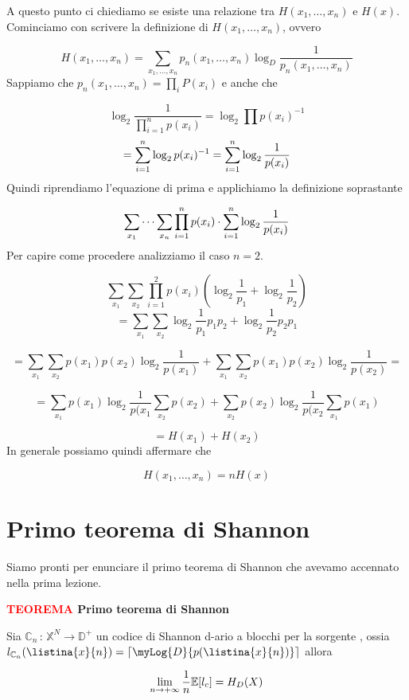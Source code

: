 \documentclass[12pt]{report}
\begin{document}
    \noindent
    A questo punto ci chiediamo se esiste una relazione tra $H(x_1,\dots,x_n)$ e $H(x)$.
    Cominciamo con scrivere la definizione di $H(x_1,\dots,x_n)$, ovvero

    $$H(x_1,\dots,x_n) = \sum_{x_1,\dots,x_n} p_n(x_1,\dots,x_n) \log_D{\frac{1}{p_n(x_1,\dots,x_n)}}$$
    Sappiamo che $p_n(x_1,\dots,x_n) = \prod_i P(x_i)$ e anche che

    $$\log_2{\frac{1}{\prod_{i=1}^n p(x_i)}} = \log_2 \prod p(x_i)^{-1} $$
    $$= \sum_{i=1}^{n} \log_2 p(x_i)^{-1} = \sum_{i=1}^{n} \log_2 \frac{1}{p(x_i)}$$
    Quindi riprendiamo l'equazione di prima e applichiamo la definizione soprastante

    $$\sum_{x_1} \dots \sum_{x_n} \prod_{i = 1}^n p(x_i) \cdot \sum_{i=1}^{n} \log_2{\frac{1}{p(x_i)}}$$
    Per capire come procedere analizziamo il caso $n=2$.

    $$\sum_{x_1} \sum_{x_2} \prod_{i=1}^2 p(x_i) (\log_2{\frac{1}{p_1}} + \log_2{\frac{1}{p_2}}) $$
    $$ = \sum_{x_1} \sum_{x_2} \log_2{\frac{1}{p_1}} p_1 p_2 +  \log_2{\frac{1}{p_2}} p_2 p_1$$

    $$=  \sum_{x_1} \sum_{x_2} p(x_1) p(x_2) \log_2{\frac{1}{p(x_1)}} +  \sum_{x_1} \sum_{x_2} p(x_1) p(x_2) \log_2{\frac{1}{p(x_2)}} = $$

    $$= \sum_{x_1} p(x_1) \log_2{\frac{1}{p(x_1}} \sum_{x_2} p(x_2) + \sum_{x_2} p(x_2) \log_2{\frac{1}{p(x_2}} \sum_{x_1} p(x_1)$$

    $$= H(x_1) + H(x_2)$$
    In generale possiamo quindi affermare che

    $$H(x_1,\dots,x_n) = n H(x)$$

    \section{Primo teorema di Shannon}
    Siamo pronti per enunciare il primo teorema di Shannon che avevamo accennato nella prima lezione.


    \vspace{5px}
    \begin{tcolorbox}
        \textbf{\textcolor{red}{TEOREMA} Primo teorema di Shannon}
        \vspace{5px}
        \begin{center}
            Sia  $\mathbb{C}_n \, :\, \mathbb{X}^N \rightarrow \mathbb{D}^+$ un codice di Shannon d-ario a blocchi per la sorgente \modello, ossia $l_{\mathbb{C}_n} (\listina{x}{n}) = \lc \myLog{D}{p(\listina{x}{n})} \rc$  allora

            $$\lim_{n\rightarrow + \infty} \frac{1}{n} \mathbb{E}[l_c] = H_D(X)$$
        \end{center}
    \end{tcolorbox}
\end{document}
